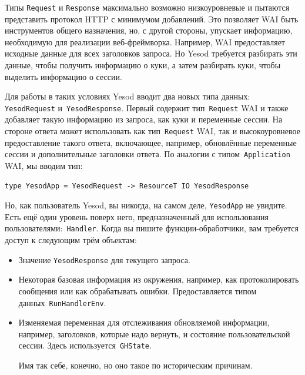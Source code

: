 Типы \lstinline'Request' и \lstinline'Response' максимально возможно
низкоуровневые и пытаются представить протокол HTTP с минимумом добавлений. Это
позволяет WAI быть инструментов общего назначения, но, с другой стороны,
упускает информацию, необходимую для реализации веб-фреймворка. Например, WAI
предоставляет исходные данные для всех заголовков запроса. Но Yesod требуется
разбирать эти данные, чтобы получить информацию о куки, а затем разбирать куки,
чтобы выделить информацию о сессии.

Для работы в таких условиях Yesod вводит два новых типа данных:
\lstinline'YesodRequest' и~\lstinline'YesodResponse'. Первый содержит
тип~\lstinline'Request' WAI и также добавляет такую информацию из запроса, как
куки и переменные сессии. На стороне ответа может использовать как
тип~\lstinline'Request' WAI, так и высокоуровневое предоставление такого
ответа, включающее, например, обновлённые переменные сессии и дополнительные
заголовки ответа. По аналогии с типом~\lstinline'Application' WAI, мы вводим
тип:
\begin{lstlisting}
type YesodApp = YesodRequest -> ResourceT IO YesodResponse
\end{lstlisting}

Но, как пользователь Yesod, вы никогда, на самом деле, \lstinline'YesodApp' не
увидите. Есть ещё один уровень поверх него, предназначенный для использования
пользователями:~\lstinline'Handler'. Когда вы пишите функции-обработчики, вам
требуется доступ к следующим трём объектам:
\begin{itemize}
    \item Значение \lstinline'YesodResponse' для текущего запроса.

    \item Некоторая базовая информация из окружения, например, как
        протоколировать сообщения или как обрабатывать ошибки. Предоставляется
        типом данных~\lstinline'RunHandlerEnv'.

    \item Изменяемая переменная для отслеживания обновляемой информации,
        например, заголовков, которые надо вернуть, и состояние
        пользовательской сессии. Здесь используется~\lstinline'GHState'.

        \begin{remark}
            Имя так себе, конечно, но оно такое по историческим причинам.
        \end{remark}
\end{itemize}

